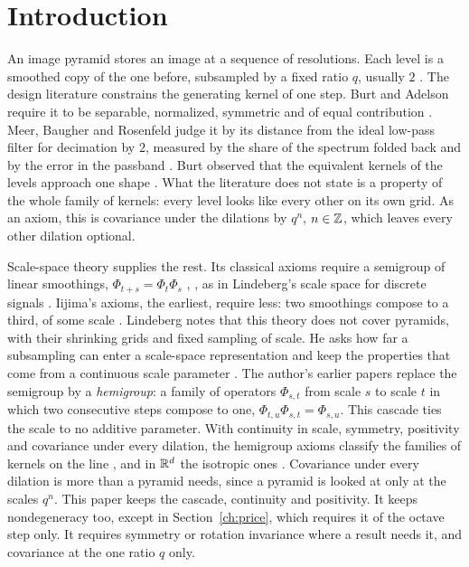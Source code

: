 \section{Introduction}
\label{sec:intro}

An image pyramid stores an image at a sequence of resolutions. Each level is a smoothed copy of the
one before, subsampled by a fixed ratio $q$, usually $2$ \cite{burt1981fast,burt1983laplacian}. The
design literature constrains the generating kernel of one step. Burt and Adelson require it to be
separable, normalized, symmetric and of equal contribution \cite[p.~533]{burt1983laplacian}. Meer,
Baugher and Rosenfeld judge it by its distance from the ideal low-pass filter for decimation by $2$,
measured by the share of the spectrum folded back and by the error in the passband
\cite[pp.~513--515]{meer1987frequency}. Burt
observed that the equivalent kernels of the levels approach one shape \cite{burt1981fast}. What the
literature does not state is a property of the whole family of kernels: every level looks like every
other on its own grid. As an axiom, this is covariance under the dilations by $q^n$, $n \in \mathbb{Z}$,
which leaves every other dilation optional.

Scale-space theory supplies the rest. Its classical axioms require a semigroup of linear smoothings,
$\Phi_{t+s} = \Phi_t\Phi_s$ \cite[\S 3, Axiom~6, p.~270]{duits2004axioms},
\cite[\S 2.4.4, p.~41]{lindeberg1994scale}, as in Lindeberg's scale space for discrete signals
\cite{lindeberg1990scalespace}. Iijima's axioms, the earliest, require less: two smoothings compose to
a third, of some scale \cite[\S 3, p.~241]{weickert1999linear}.
Lindeberg notes that this theory does not cover pyramids, with their shrinking grids and fixed
sampling of scale. He asks how far a subsampling can enter a scale-space representation and keep the
properties that come from a continuous scale parameter \cite[\S 3.4.1, p.~82; \S 4.5.4,
p.~122]{lindeberg1994scale}.
The author's earlier papers replace the semigroup by a \emph{hemigroup}: a family of operators
$\Phi_{s,t}$ from scale $s$ to scale $t$ in which two consecutive steps compose to one,
$\Phi_{t,u}\Phi_{s,t} = \Phi_{s,u}$. This cascade ties the scale to no additive parameter. With
continuity in scale, symmetry, positivity and covariance under every dilation, the hemigroup axioms
classify the families of kernels on the line , and in $\mathbb{R}^d$ the
isotropic ones . Covariance under every dilation is more than a
pyramid needs, since a pyramid is looked at only at the scales $q^n$. This paper keeps the cascade,
continuity and positivity. It keeps nondegeneracy too, except in Section~\ref{ch:price}, which
requires it of the octave step only. It requires symmetry or rotation invariance where a result needs it,
and covariance at the one ratio $q$ only.

